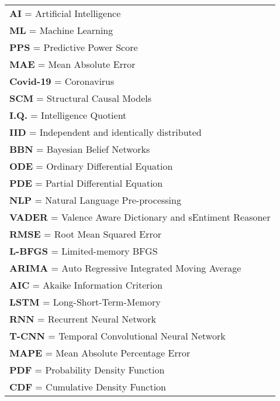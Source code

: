 \newpage
{}

\begin{Listofabbreviations}

\begin{center}
    \begin{tabular}{@{}l@{}}
    \textbf{AI} = Artificial Intelligence \\
    \textbf{ML} = Machine Learning \\
    \textbf{PPS} = Predictive Power Score \\
    \textbf{MAE} = Mean Absolute Error \\
    \textbf{Covid-19} = Coronavirus \\
    \textbf{SCM} = Structural Causal Models \\
    \textbf{I.Q.} = Intelligence Quotient \\
    \textbf{IID} = Independent and identically distributed \\
    \textbf{BBN} = Bayesian Belief Networks \\
    \textbf{ODE} = Ordinary Differential Equation \\
    \textbf{PDE} = Partial Differential Equation \\
    \textbf{NLP} = Natural Language Pre-processing \\
    \textbf{VADER} = Valence Aware Dictionary and sEntiment Reasoner \\
    \textbf{RMSE} = Root Mean Squared Error \\ 
    \textbf{L-BFGS} = Limited-memory BFGS \\ 
    \textbf{ARIMA} = Auto Regressive Integrated Moving Average \\
    \textbf{AIC} = Akaike Information Criterion \\
    \textbf{LSTM} = Long-Short-Term-Memory \\
    \textbf{RNN} = Recurrent Neural Network \\
    \textbf{T-CNN} = Temporal Convolutional Neural Network \\
    \textbf{MAPE} = Mean Absolute Percentage Error \\
    \textbf{PDF} = Probability Density Function \\
    \textbf{CDF} = Cumulative Density Function \\
    \end{tabular}
\end{center}

\end{Listofabbreviations}